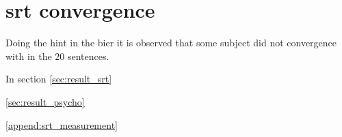 \section{\gls{srt} convergence}
Doing the \gls{hint} in the \gls{bier} it is observed that some subject did not convergence with in the 20 sentences.


In section \autoref{sec:result_srt} 



 \autoref{sec:result_psycho} 






\autoref{append:srt_measurement}